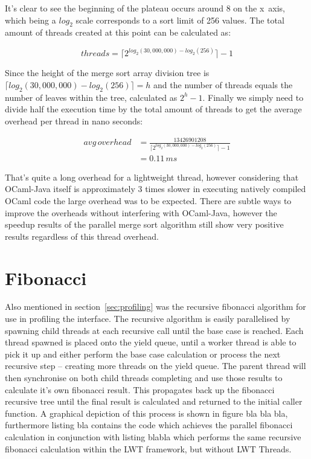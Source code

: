 \documentclass[12pt,twoside,notitlepage]{report}
\begin{document}
It's clear to see the beginning of the plateau occurs around 8 on the x~axis, which being a $log_{2}$ scale corresponds to a sort limit of 256 values. The total amount of threads created at this point can be calculated as:

\[ threads = \lceil2^{log_{2}(30,000,000) - log_{2}(256)}\rceil - 1\]

Since the height of the merge sort array division tree is $\lceil log_{2}(30,000,000) - log_{2}(256)\rceil = h$ and the number of threads equals the number of leaves within the tree, calculated as $2^{h}-1$. Finally we simply need to
divide half the execution time by the total amount of threads to get the average overhead per thread in nano seconds:

\begin{align*}
avg\,overhead &= \frac{13426901208}{\lceil2^{log_{2}(30,000,000) - log_{2}(256)}\rceil - 1} \\
                    &= 0.11\,ms
\end{align*}

That's quite a long overhead for a lightweight thread, however considering that OCaml-Java itself is approximately 3 times slower in executing natively compiled OCaml code\cite{web:clerc2013} the large overhead was to be expected.
There are subtle ways to improve the overheads without interfering with OCaml-Java, however the speedup results of the parallel merge sort algorithm still show very positive results regardless of this thread overhead.

\section{Fibonacci}
\label{sec:fibonacci}
%
%
Also mentioned in section~\ref{sec:profiling} was the recursive fibonacci algorithm for use in profiling the interface. The recursive algorithm is easily parallelised by spawning child threads at each recursive call until the base
case is reached. Each thread spawned is placed onto the yield queue, until a worker thread is able to pick it up and either perform the base case calculation or process the next recursive step -- creating more threads on the yield
queue. The parent thread will then synchronise on both child threads completing and use those results to calculate it's own fibonacci result. This propagates back up the fibonacci recursive tree until the final result is calculated
and returned to the initial caller function. A graphical depiction of this process is shown in figure bla bla bla, furthermore listing bla  contains the code which achieves the parallel fibonacci calculation in conjunction with listing blabla which performs the same recursive fibonacci calculation within the LWT framework, but
without LWT Threads.
\end{document}
